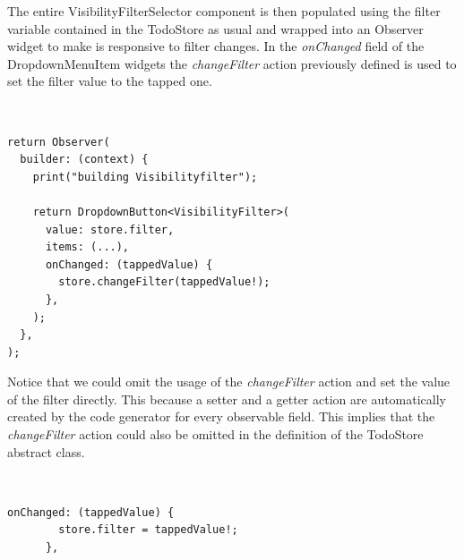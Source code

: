 The entire VisibilityFilterSelector component is then populated using the filter  variable contained in the TodoStore as usual and wrapped into an Observer widget to make is responsive to filter changes. In the \textit{onChanged} field of the DropdownMenuItem widgets the \textit{changeFilter} action previously defined is used to
set the filter value to the tapped one.
\begin{code}
\mbox{}\\
 \mbox{}
		\label{code:2.14}
\begin{verbatim}
return Observer(
  builder: (context) {
    print("building Visibilityfilter");

    return DropdownButton<VisibilityFilter>(
      value: store.filter,
      items: (...),
      onChanged: (tappedValue) {
        store.changeFilter(tappedValue!);
      },
    );
  },
);
\end{verbatim}
\mbox{}
\end{code}

Notice that we could omit the usage of the \textit{changeFilter} action and set the value of the filter directly. This because a setter and a getter action are automatically created by the code generator for every observable field. This implies that the \textit{changeFilter} action could also be omitted in the definition of the TodoStore abstract class.
\begin{code}
\mbox{}\\
 \mbox{}
		\label{code:2.14}
\begin{verbatim}
onChanged: (tappedValue) {
        store.filter = tappedValue!; 
      },
\end{verbatim}
\mbox{}
\end{code}

